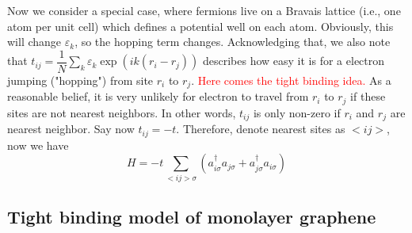 \documentclass{article}
\begin{document}
Now we consider a special case, where fermions live on a Bravais lattice (i.e., one atom per unit cell) which defines a potential well on each atom. Obviously, this will change $\varepsilon_k$, so the hopping term changes. Acknowledging that, we also note that $t_{ij} = \dfrac{1}{N} \underset{k}{\sum}\varepsilon_k\exp{(ik(r_i-r_j))}$ describes how easy it is for a electron jumping ("hopping") from site $r_i$ to $r_j$. \textcolor{red}{Here comes the tight binding idea.} As a reasonable belief, it is very unlikely for electron to travel from $r_i$ to $r_j$ if these sites are not nearest neighbors. In other words, $t_{ij}$ is only non-zero if $r_i$ and $r_j$ are nearest neighbor. Say now $t_{ij}=-t$. Therefore, denote nearest sites as $<ij>$, now we have
\begin{equation}
    H = - t \underset{< i j > \sigma}{\sum} (a_{i \sigma}^{\dag} a_{j \sigma} +a_{j \sigma}^{\dag} a_{i \sigma})
    \label{tb}
\end{equation}

\subsection{Tight binding model of monolayer graphene}
\end{document}
